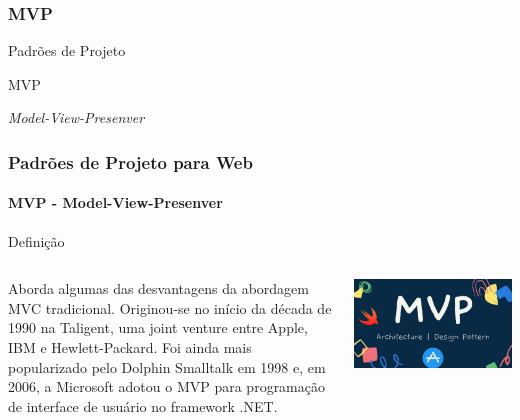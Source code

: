 \documentclass[
	10pt, %
	t, %
]{beamer}
\begin{document}
\subsubsection{MVP}

\begin{frame}
	\begin{center}
		
		\bigskip\bigskip\bigskip\bigskip %
		{\Large Padrões de Projeto}
		
		\bigskip\bigskip %
		{\Huge MVP}
		
		\smallskip
		{\small \textit{Model-View-Presenver}}
	\end{center}

\end{frame}

\begin{frame}
	\frametitle{Padrões de Projeto para Web}
	\framesubtitle{MVP - Model-View-Presenver}

	\begin{block}{Definição}
	\begin{columns}[c] %
			\begin{column}{0.8\textwidth} %
				Aborda algumas das desvantagens da abordagem MVC tradicional. Originou-se no início da década de 1990 na Taligent, uma joint venture entre Apple, IBM e Hewlett-Packard. Foi ainda mais popularizado pelo Dolphin Smalltalk em 1998 e, em 2006, a Microsoft adotou o MVP para programação de interface de usuário no framework .NET.
			\end{column}

			\begin{column}{0.2\textwidth} %
				\includegraphics[width=0.9\linewidth]{Images/mvp_logo.jpg}
			\end{column}
		\end{columns}
	\end{block}

\end{frame}
\end{document}
